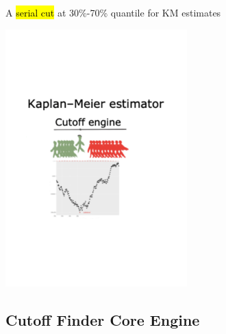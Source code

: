 \documentclass[
paper=landscape,
paper=160mm:90mm, %
fontsize=11pt, %
pagesize, %
parskip=half-, %
]{scrartcl} %
\theoremstyle{mythmstyle} %
\begin{document}
\begin{minipage}[c]{0.45\linewidth}
A \hl{serial cut} at 30\%-70\% quantile for KM estimates
\end{minipage}
\begin{minipage}[c]{0.45\linewidth}
\centering
\includegraphics[width=7cm]{KM_cutoff.pdf}
\end{minipage}

\clearpage


\subsection{Cutoff Finder Core Engine}
\thispagestyle{headings}
\end{document}
